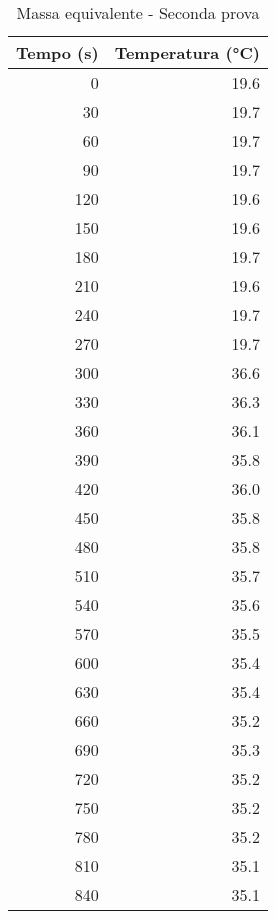 \documentclass[10pt,twocolumn]{article}
\begin{document}
\begin{table}[H]
\begin{minipage}{0.5\textwidth}
\centering
\caption*{Massa equivalente - Seconda prova}
\label{tab:temp3}

\begin{tabular}{|r|r|}
\hline
Tempo (s) & Temperatura (°C) \\ 
\hline
0 & 19.6 \\ \hline 
30 & 19.7 \\ \hline 
60 & 19.7 \\ \hline 
90 & 19.7 \\ \hline 
120 & 19.6 \\ \hline 
150 & 19.6 \\ \hline 
180 & 19.7 \\ \hline 
210 & 19.6 \\ \hline 
240 & 19.7 \\ \hline 
270 & 19.7 \\ \hline 
300 & 36.6 \\ \hline 
330 & 36.3 \\ \hline 
360 & 36.1 \\ \hline 
390 & 35.8 \\ \hline 
420 & 36.0 \\ \hline 
450 & 35.8 \\ \hline 
480 & 35.8 \\ \hline 
510 & 35.7 \\ \hline 
540 & 35.6 \\ \hline 
570 & 35.5 \\ \hline 
600 & 35.4 \\ \hline 
630 & 35.4 \\ \hline 
660 & 35.2 \\ \hline 
690 & 35.3 \\ \hline 
720 & 35.2 \\ \hline 
750 & 35.2 \\ \hline 
780 & 35.2 \\ \hline 
810 & 35.1 \\ \hline 
840 & 35.1 \\ \hline 
\end{tabular}
\end{minipage}
\end{table}
\pagebreak
\end{document}
